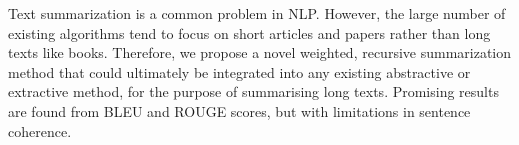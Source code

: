
Text summarization is a common problem in NLP. However, the large number of existing algorithms tend to focus on short articles and papers rather than long texts like books. Therefore, we propose a novel weighted, recursive summarization method that could ultimately be integrated into any existing abstractive or extractive method, for the purpose of summarising long texts. Promising results are found from BLEU and ROUGE scores, but with limitations in sentence coherence.